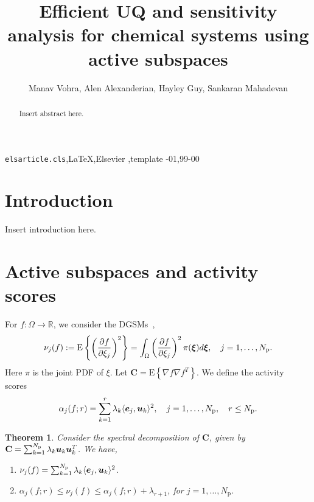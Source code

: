 \documentclass[1pt]{elsarticle}
\renewcommand{\vec}[1]{{\mathchoice
                     {\mbox{\boldmath$\displaystyle{#1}$}}
                     {\mbox{\boldmath$\textstyle{#1}$}}
                     {\mbox{\boldmath$\scriptstyle{#1}$}}
                     {\mbox{\boldmath$\scriptscriptstyle{#1}$}}}}
\newcommand{\R}{\mathbb{R}}
\newcommand{\ip}[2]{\langle{#1}, {#2}\rangle}
\newcommand{\mat}[1]{\mathbf{{#1}}}
\newcommand{\Np}{{N_\text{p}}}
\newcommand{\E}[1]{\mathrm{E}\left\{{#1} \right\}}
\newtheorem{theorem}{Theorem}[section]
\begin{document}
\begin{frontmatter}

\title{Efficient UQ and sensitivity analysis for chemical systems using active 
subspaces}

\author{Manav Vohra, Alen Alexanderian, Hayley Guy, Sankaran Mahadevan}
\address{Vanderbilt, NCSU}




\begin{abstract}
Insert abstract here.
\end{abstract}

\begin{keyword}
\texttt{elsarticle.cls}\sep \LaTeX\sep Elsevier \sep template
-01\sep  99-00
\end{keyword}

\end{frontmatter}


\section{Introduction}
Insert introduction here.

\section{Active subspaces and activity scores}
For $f: \Omega \to \R$, we consider the DGSMs~\cite{SobolKucherenko09},
\[
    \nu_j(f) := \E{\left(\frac{\partial f}{\partial\xi_j}\right)^2} =
                  \int_\Omega 
                  \left(\frac{\partial f}{\partial\xi_j}\right)^2
                  \pi(\vec{\xi})d\vec{\xi}, \quad j = 1, \ldots, \Np.   
\]
Here $\pi$ is the joint PDF of $\xi$. 
Let $\mat{C} = \E{\nabla f \nabla f^T}$.
We define the activity scores~\cite{Diaz16}
\[
   \alpha_j(f; r) =  \sum_{k=1}^r \lambda_k \ip{\vec{e}_j}{\vec{u}_k}^2,
   \quad j = 1, \ldots, \Np, \quad r \leq \Np.
\]
\begin{theorem}
Consider the spectral decomposition of $\mat{C}$, given by  
$\mat{C} = \sum_{k=1}^\Np \lambda_k \vec{u}_k \vec{u}_k^T$.
We have,
\begin{enumerate}
\item $\nu_j(f) = \sum_{k=1}^\Np \lambda_k \ip{\vec{e}_j}{\vec{u}_k}^2$.
\item $\alpha_j(f; r) \leq \nu_j(f) \leq \alpha_j(f; r) + \lambda_{r+1}$, 
for $j=1, \ldots, \Np$.
\end{enumerate}
\end{theorem} 
\end{document}

